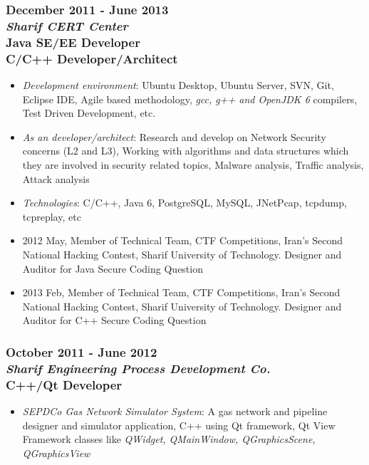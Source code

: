 \documentclass[10pt,a4paper]{article}
\begin{document}
\subsubsection{{December 2011 - June 2013} \\ \textnormal {\textit {Sharif CERT Center}} \\ {Java SE/EE Developer \\ C/C++ Developer/Architect}}
  \setlength{\leftskip}{0.5cm}
  \setlength{\rightskip}{1cm}
	\begin{itemize}
		\setlength{\rightskip}{1cm}
    \setlength\itemsep{0em}
    \item \small \textit {Development environment}: Ubuntu Desktop, Ubuntu Server, SVN, Git, Eclipse IDE, Agile based methodology, \textit {gcc, g++ and OpenJDK 6} compilers, Test Driven Development, etc.
    \item \small \textit {As an developer/architect}: Research and develop on Network Security concerns (L2 and L3), Working with algorithms and data structures which they are involved in security related topics, Malware analysis, Traffic analysis, Attack analysis
    \item \small \textit {Technologies}: C/C++, Java 6, PostgreSQL, MySQL, JNetPcap, tcpdump, tcpreplay, etc
		\item \small 2012 May, Member of Technical Team, CTF Competitions, Iran's Second National Hacking Contest, Sharif University of Technology. Designer and Auditor for Java Secure Coding Question
		\item \small 2013 Feb, Member of Technical Team, CTF Competitions, Iran's Second National Hacking Contest, Sharif University of Technology. Designer and Auditor for C++ Secure Coding Question
	\end{itemize}
  \setlength{\leftskip}{0pt}
  \setlength{\rightskip}{0cm}
	  
\subsubsection{{October 2011 - June 2012} \\ \textnormal {\textit {Sharif Engineering Process Development Co.}} \\ {C++/Qt Developer}}
  \setlength{\leftskip}{0.5cm}
  \setlength{\rightskip}{1cm}
  \begin{itemize}
    \setlength{\rightskip}{1cm}
    \setlength\itemsep{0em}
		\item \small \textit{SEPDCo Gas Network Simulator System}: A gas network and pipeline designer and simulator application, C++ using Qt framework, Qt View Framework classes like \textit {QWidget, QMainWindow, QGraphicsScene, QGraphicsView}
  \end{itemize}
  \setlength{\leftskip}{0pt}
  \setlength{\rightskip}{0cm}
  
\end{document}
